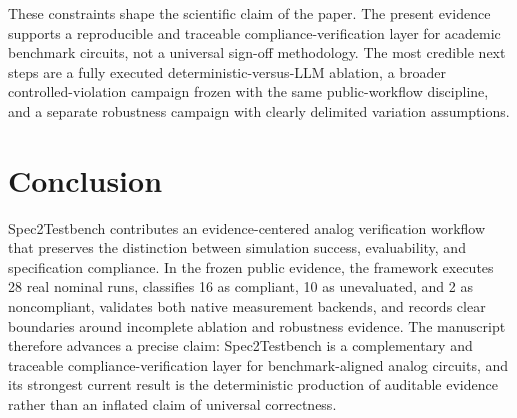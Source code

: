 \documentclass[conference]{IEEEtran}%
\begin{document}
These constraints shape the scientific claim of the paper. The present evidence supports a reproducible and traceable compliance-verification layer for academic benchmark circuits, not a universal sign-off methodology. The most credible next steps are a fully executed deterministic-versus-LLM ablation, a broader controlled-violation campaign frozen with the same public-workflow discipline, and a separate robustness campaign with clearly delimited variation assumptions.

\section{Conclusion}
Spec2Testbench contributes an evidence-centered analog verification workflow that preserves the distinction between simulation success, evaluability, and specification compliance. In the frozen public evidence, the framework executes 28 real nominal runs, classifies 16 as compliant, 10 as unevaluated, and 2 as noncompliant, validates both native measurement backends, and records clear boundaries around incomplete ablation and robustness evidence. The manuscript therefore advances a precise claim: Spec2Testbench is a complementary and traceable compliance-verification layer for benchmark-aligned analog circuits, and its strongest current result is the deterministic production of auditable evidence rather than an inflated claim of universal correctness.



\end{document}
